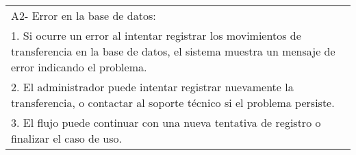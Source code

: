 \documentclass[stu, 12pt, letterpaper, donotrepeattitle, floatsintext, natbib]{apa7}
\begin{document}
\begin{longtable}{@{} p{16.5cm} @{}}
    A2- Error en la base de datos:                                                                                                                                                                                                           \\
    \hspace{1cm}1. Si ocurre un error al intentar registrar los movimientos de transferencia en la base de datos, el sistema muestra un mensaje de error indicando el problema.                                                              \\
    \hspace{1cm}2. El administrador puede intentar registrar nuevamente la transferencia, o contactar al soporte t\'ecnico si el problema persiste.                                                                                          \\
    \hspace{1cm}3. El flujo puede continuar con una nueva tentativa de registro o finalizar el caso de uso.                                                                                                                                  \\ \bottomrule
\end{longtable}
\newpage
\end{document}
